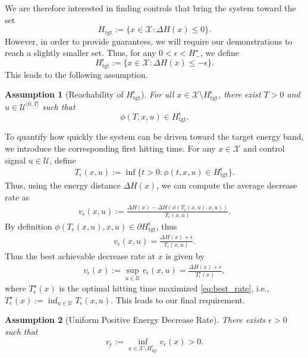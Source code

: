 \documentclass[letterpaper, 10 pt, conference]{ieeeconf}
\newtheorem{assumption}{Assumption}
\newcommand{\tgt}{\mathrm{tgt}}
\begin{document}
We are therefore interested in finding controls that bring the system toward the set
\[
H_{\tgt} := \{x \in \mathcal{X} : \Delta H(x) \leq 0\}.
\]
However, in order to provide guarantees, we will require our demonstrations to reach a slightly smaller set. Thus, for any $0 < \epsilon < H^\star_-$, we define
\[
H_{\tgt}^\epsilon := \{x \in \mathcal{X} : \Delta H(x)\leq -\epsilon\}.
\]
This leads to the following assumption.

\begin{assumption}[Reachability of $H_{\tgt}^\epsilon$]
\label{ass_reachability_of_the_target_set}
For all $x \in \mathcal{X} \setminus H_{\tgt}^\epsilon$, there exist $T > 0$ and $u \in \mathcal{U}^{(0,T]}$ such that
\[
\phi(T,x,u) \in H_{\tgt}^\epsilon.
\]
\end{assumption}

To quantify how quickly the system can be driven toward the target energy band, we introduce the corresponding first hitting time. For any $x \in \mathcal{X}$ and control signal $u \in \mathcal{U}$, define
\begin{align*}
T_\epsilon(x,u) := \inf\{t>0 : \phi(t,x,u)\in H_{\tgt}^\epsilon\}.
\end{align*}
Thus, using the energy distance $\Delta H(x)$, we can compute the average decrease rate as
\begin{align}
v_\epsilon(x,u) := \frac{\Delta H(x)-\Delta H(\phi(T_\epsilon(x,u),x,u))}{T_\epsilon(x,u)}.
\label{eq:energy_rate}
\end{align}
By definition $\phi(T_\epsilon(x,u),x,u)\in \partial H_{\tgt}^\epsilon$, thus
\begin{align*}
v_\epsilon(x,u)=\frac{\Delta H(x)+\epsilon}{T_\epsilon(x,u)}.
\end{align*}
Thus the best achievable decrease rate at $x$ is given by
\begin{align}
v_\epsilon(x):=\sup_{u\in\mathcal{U}} v_\epsilon(x,u)=\frac{\Delta H(x)+\epsilon}{T_\epsilon^\star(x)},
\label{eq:best_rate}
\end{align}
where $T^\star_\epsilon(x)$ is the optimal hitting time maximized \eqref{eq:best_rate}, i.e., $T^\star_\epsilon(x):=\inf_{u\in\mathcal U}T_\epsilon(x,u)$.
This leads to our final requirement.
\begin{assumption}[Uniform Positive Energy Decrease Rate]
\label{ass_lowest_speed}
There exists $\epsilon>0$ such that
\[
\underline{v_\epsilon} := \inf_{x\in \mathcal{X}\setminus H_{\tgt}^\epsilon} v_\epsilon(x) > 0.
\]
\end{assumption}
\end{document}
